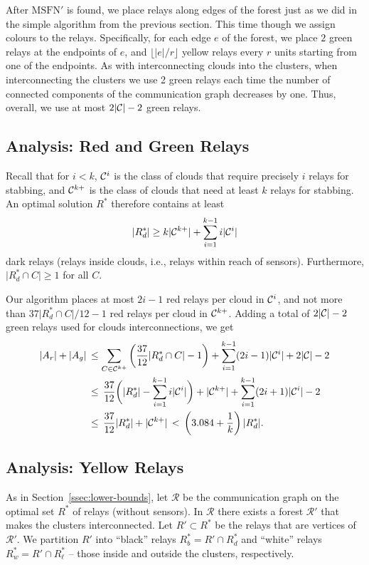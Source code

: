 \documentclass[11pt,a4paper]{article}
\newcommand{\floor}[1]{\lfloor{#1}\rfloor}
\newcommand{\s}[1]{{\lvert #1 \rvert}}
\newcommand{\myR}{\mathcal{R}}
\newcommand{\MSTN}{\mathrm{MSFN}}
\newcommand{\optrel}{R^{*}}
\theoremstyle{definition}
\theoremstyle{remark}
\begin{document}
After $\MSTN'$ is found, we place relays along edges of the forest just as we did in the simple algorithm from the previous section. This time though we assign colours to the relays. Specifically, for each edge $e$ of the forest, we place $2$ green relays at the endpoints of $e$, and $\floor{\s{e}/r}$ yellow relays every $r$ units starting from one of the endpoints.
As with interconnecting clouds into the clusters, when interconnecting the clusters we use 2 green relays each time the number of connected components of the communication graph decreases by one.  Thus, overall, we use at most $2\s{\myC}-2$ green relays.

\subsection{Analysis: Red and Green Relays}

Recall that for $i<k$, $\mathcal{C}^i$ is the class of clouds that require precisely $i$ relays for stabbing, and $\mathcal{C}^{k+}$ is the class of clouds that need at least $k$ relays for stabbing.  An optimal solution $\optrel$ therefore contains at least
\[
    \s{\optrel_d} \ge k\s{\myC^{k+}}+\sum_{i=1}^{k-1}i \s{\myC^i}
\]
dark relays (relays inside clouds, i.e., relays within reach of sensors).  Furthermore, $\s{\optrel_d \cap C} \ge 1$ for all $C$.

Our algorithm places at most $2i-1$ red relays per cloud in $\mathcal{C}^i$, and not more than $37 \s{\optrel_d\cap C} / 12 -1$ red relays per cloud in $\mathcal{C}^{k+}$. Adding a total of $2\s{\myC}-2$ green relays used for clouds interconnections, we get
\begin{align*}
    \s{A_r}+\s{A_g}
    &\,\le \sum_{C \in \myC^{k+}} \left( \frac{37}{12} \s{\optrel_d \cap C} - 1 \right) +
\sum_{i=1}^{k-1} (2i-1)\s{\myC^{i}} + 2 \s{\myC} - 2 \\
    &\,\le\, \frac{37}{12} \biggl( \s{\optrel_d} - \sum_{i=1}^{k-1} i\s{\myC^{i}} \biggr) + \s{\myC^{k+}} + \sum_{i=1}^{k-1} (2i+1)\s{\myC^{i}} - 2 \\
    &\,\le\, \frac{37}{12} \s{\optrel_d} + \s{\myC^{k+}}
    \,<\, \left( 3.084 +\frac{1}{k} \right) \s{\optrel_d}.
\end{align*}

\subsection{Analysis: Yellow Relays}

As in Section~\ref{ssec:lower-bounds}, let $\myR$ be the communication graph on the optimal set $\optrel$ of relays (without sensors). In $\myR$ there exists a forest $\myR'$ that makes the clusters interconnected.  Let $R'\subset\optrel$ be the relays that are vertices of $\myR'$. We partition $R'$ into ``black'' relays $\optrel_b = R' \cap \optrel_d$ and ``white'' relays $\optrel_w = R' \cap \optrel_\ell$ -- those inside and outside the clusters, respectively.
\end{document}
